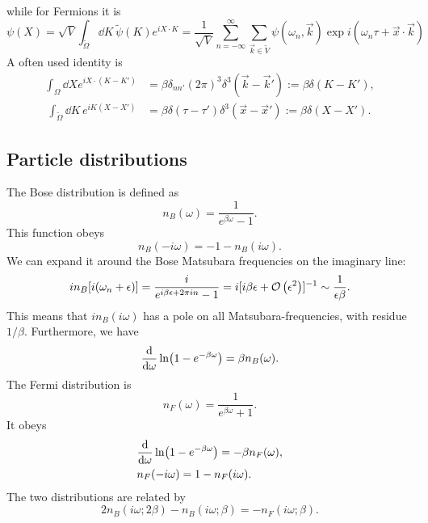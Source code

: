 while for Fermions it is
\begin{equation}
    \psi(X) 
    = \sqrt{V} \int_{\tilde \Omega} \dd K \, \tilde \psi(K) e^{i X\cdot K} 
    = \frac{1}{\sqrt{V}} \sum_{n = - \infty}^\infty \sum_{\vec k \in \tilde V}
    \psi(\omega_n, \vec k) \exp{i(\omega_n \tau + \vec x \cdot \vec k)}
\end{equation}
A often used identity is 
\begin{align}
    \label{thermal delta}
    \int_{\Omega} \dd X e^{i X\cdot(K - K')} 
    & = \beta \delta_{nn'} (2 \pi)^3 \delta^3(\vec k - \vec k') := \beta \delta(K - K'), \\\
    \int_{\tilde \Omega} \dd K \, e^{i K(X - X')} 
    & = \beta \delta (\tau - \tau') \delta^3(\vec x - \vec x') 
    := \beta \delta(X - X').
\end{align}

\subsection{Particle distributions}
The Bose distribution is defined as 
\begin{equation}
    n_B(\omega) = \frac{1}{e^{\beta \omega} - 1}.
\end{equation}
This function obeys
\begin{equation}
    n_B(- i \omega) = -1 - n_B(i \omega).
\end{equation}
We can expand it around the Bose Matsubara frequencies on the imaginary line:
\begin{equation}
    i n_B[i (\omega_n + \epsilon)] = \frac{i}{e^{i\beta \epsilon + 2 \pi i n} - 1}
    = i [i\beta \epsilon + \mathcal{O}\left(\epsilon^{2}\right) ]^{-1} \sim  \frac{1}{\epsilon \beta}.
\end{equation}
This means that $in_B(i\omega)$ has a pole on all Matsubara-frequencies, with residue $1/\beta$.
Furthermore, we have
\begin{equation}
    \dv{\omega} \ln(1 - e^{-\beta \omega}) = \beta n_B(\omega).
\end{equation}
The Fermi distribution is
\begin{equation}
    n_F(\omega) = \frac{1}{e^{\beta \omega} + 1}.
\end{equation}
It obeys
\begin{align}
    &\diff{}{\omega} \ln(1 - e^{-\beta \omega}) = - \beta n_F(\omega), \\
    & n_F(- i\omega) = 1 - n_F(i\omega).
\end{align}
The two distributions are related by
\begin{equation}
    2 n_B(i \omega; 2\beta) - n_B(i \omega; \beta)
    = - n_F(i \omega; \beta ).
\end{equation}

